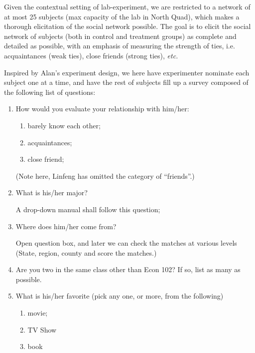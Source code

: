 
Given the contextual setting of lab-experiment, we are restricted to a network
of at most 25 subjects (max capacity of the lab in North Quad), which makes a
thorough elicitation of the social network possible. The goal is to elicit the
social network of subjects (both in control and treatment groups) as complete and
detailed as possible, with an emphasis of measuring the strength of ties, i.e.
acquaintances (weak ties), close friends (strong ties), \textit{etc.}

Inspired by Alan's experiment design, we here have experimenter nominate each
subject one at a time, and have the rest of subjects fill up a survey composed
of the following list of questions:
\begin{enumerate}
    \item How would you evaluate your relationship with him/her:
        \begin{enumerate}
            \item barely know each other;
            \item acquaintances;
            \item close friend;
        \end{enumerate}
        (Note here, Linfeng has omitted the category of ``friends''.)
    \item What is his/her major?

        A drop-down manual shall follow this question;
    \item Where does him/her come from?

        Open question box, and later we can check the matches at various levels
        (State, region, county and score the matches.)


    \item Are you two in the same class other than Econ 102? If so, list as many 
          as possible.

    \item What is his/her favorite (pick any one, or more, from the following)
        \begin{enumerate}
            \item movie;
            \item TV Show
            \item book
        \end{enumerate}
        

\end{enumerate}
